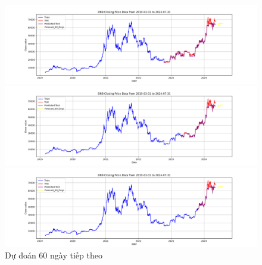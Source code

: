 \documentclass[conference]{IEEEtran}
\begin{document}
\begin{figure}[H]
    \centering
    \begin{minipage}{0.15\textwidth}
    \centering
    \includegraphics[width=1\textwidth]{Figure/RandomForest_BTC_60days_73.png}
    \end{minipage}
    \hfill
    \begin{minipage}{0.15\textwidth}
    \centering
    \includegraphics[width=1\textwidth]{Figure/RandomForest_BTC_60days_82.png}
    \end{minipage}
    \hfill
    \begin{minipage}{0.15\textwidth}
    \centering
    \includegraphics[width=1\textwidth]{Figure/RandomForest_BTC_60days_91.png}
    \end{minipage}
    \caption{Dự đoán 60 ngày tiếp theo}
    \label{fig:1}
\end{figure}
\end{document}
